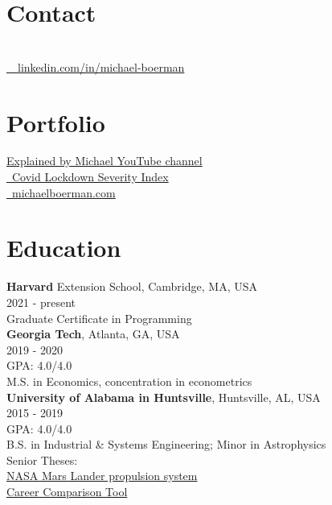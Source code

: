 \documentclass[margin,line]{res}
\begin{document}

\begin{resume}
\section{\sc Contact}
\vspace{.05in}

 \\
\faLinkedinIn  \href{https://www.linkedin.com/in/michael-boerman}{\ttfamily \, \, linkedin.com/in/michael-boerman}\\

\section{\sc Portfolio}
 \href{https://www.youtube.com/channel/UCxFMrMb6PrS7SOrQi-BfMUw/videos?view=0&sort=p&flow=grid}{ Explained by Michael YouTube channel}\\
\faChartLine \href{https://github.com/michaelboerman/lockdown_severity_index#readme}{\, Covid Lockdown Severity Index}\\
\faMediumM \href{https://michaelboerman.com/}{\ttfamily  \, michaelboerman.com}\\


\section{\sc Education}
{\bf Harvard} Extension School, Cambridge, MA, USA\\
2021 - present\\
Graduate Certificate in Programming\\

{\bf Georgia Tech}, Atlanta, GA, USA\\
2019 - 2020\\
GPA: 4.0/4.0\\
M.S. in Economics, concentration in econometrics\\

{\bf University of Alabama in Huntsville}, Huntsville, AL, USA\\
2015 - 2019\\
GPA: 4.0/4.0\\
B.S. in Industrial \& Systems Engineering; Minor in Astrophysics\\
Senior Theses: \\
\hspace{5mm}{\it -- Systems Engineering:} \href{https://tinyurl.com/ISEEM-SD}{NASA Mars Lander propulsion system}\\
\hspace{5mm}{\it -- Economic Decision Analysis:} \href{http://tinyurl.com/BoermanCareerChoice
}{Career Comparison Tool}


\end{resume}
\end{document}
